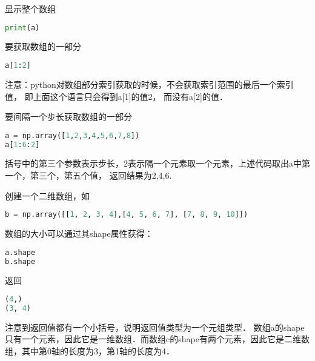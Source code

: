 显示整个数组
\begin{lstlisting}[language=python]
print(a)
\end{lstlisting}
要获取数组的一部分
\begin{lstlisting}[language=python]
a[1:2]
\end{lstlisting}
注意：python对数组部分索引获取的时候，不会获取索引范围的最后一个索引值， 即上面这个语言只会得到a[1]的值2， 而没有a[2]的值．

要间隔一个步长获取数组的一部分

\begin{lstlisting}[language=python]
a = np.array([1,2,3,4,5,6,7,8])
a[1:6:2]
\end{lstlisting}
括号中的第三个参数表示步长，2表示隔一个元素取一个元素，上述代码取出a中第一个，第三个，第五个值， 返回结果为2,4,6.

创建一个二维数组，如
\begin{lstlisting}[language=python]
b = np.array([[1, 2, 3, 4],[4, 5, 6, 7], [7, 8, 9, 10]])
\end{lstlisting}
数组的大小可以通过其shape属性获得：
\begin{lstlisting}[language=python]
a.shape
b.shape
\end{lstlisting}
返回
\begin{lstlisting}[language=python]
(4,)
(3, 4)
\end{lstlisting}
注意到返回值都有一个小括号，说明返回值类型为一个元组类型． 数组a的shape只有一个元素，因此它是一维数组．而数组c的shape有两个元素，因此它是二维数组，其中第0轴的长度为3，第1轴的长度为4．


